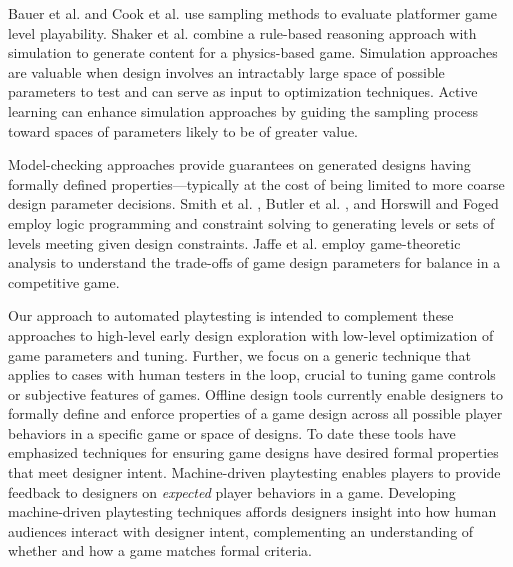 \documentclass{sig-alternate}
\begin{document}
Bauer et al. \cite{bauer2013:rrt-generation} and Cook et al. \cite{cook2012:coopcoevo} use sampling methods to evaluate platformer game level playability.
Shaker et al. \cite{shaker2013:ropossum-test} combine a rule-based reasoning approach with simulation to generate content for a physics-based game.
Simulation approaches are valuable when design involves an intractably large space of possible parameters to test and can serve as input to optimization techniques.
Active learning can enhance simulation approaches by guiding the sampling process toward spaces of parameters likely to be of greater value.

Model-checking approaches provide guarantees on generated designs having formally defined properties---typically at the cost of being limited to more coarse design parameter decisions.
Smith et al. \cite{smith2013:quantify-play}, Butler et al. \cite{butler2013:progression-tool}, and Horswill and Foged \cite{horswill2012:levelgen} employ logic programming and constraint solving to generating levels or sets of levels meeting given design constraints.
Jaffe et al. \cite{jaffe2012:balance} employ game-theoretic analysis to understand the trade-offs of game design parameters for balance in a competitive game.

Our approach to automated playtesting is intended to complement these approaches to high-level early design exploration with low-level optimization of game parameters and tuning.
Further, we focus on a generic technique that applies to cases with human testers in the loop, crucial to tuning game controls or subjective features of games.
%
Offline design tools currently enable designers to formally define and enforce properties of a game design across all possible player behaviors in a specific game or space of designs.
To date these tools have emphasized techniques for ensuring game designs have desired formal properties that meet designer intent.
%
Machine-driven playtesting enables players to provide feedback to designers on \textit{expected} player behaviors in a game.
Developing machine-driven playtesting techniques affords designers insight into how human audiences interact with designer intent, complementing an understanding of whether and how a game matches formal criteria.
\end{document}
